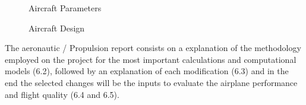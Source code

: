 \begin{figure}[H] %
\caption{Aircraft Parameters}
\label{tab:larissa2}
\end{figure}




\begin{figure}[H] %
\caption{Aircraft Design}
\label{fig:aircraftdesign}
\end{figure}




The aeronautic / Propulsion report consists on a explanation of the methodology employed on the project for the most important calculations and computational models (6.2), followed by an explanation of each modification (6.3) and in the end the selected changes will be the inputs to evaluate the airplane performance and flight quality (6.4 and 6.5).
